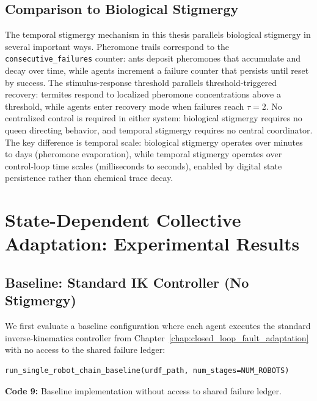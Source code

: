 \documentclass[12pt,a4paper,oneside]{report}
\begin{document}
\subsection{Comparison to Biological Stigmergy}
\label{subsec:comparison_to_biological_stigmergy}

The temporal stigmergy mechanism in this thesis parallels biological stigmergy in several important ways. Pheromone trails correspond to the \texttt{consecutive\_failures} counter: ants deposit pheromones that accumulate and decay over time, while agents increment a failure counter that persists until reset by success. The stimulus-response threshold parallels threshold-triggered recovery: termites respond to localized pheromone concentrations above a threshold, while agents enter recovery mode when failures reach $\tau = 2$. No centralized control is required in either system: biological stigmergy requires no queen directing behavior, and temporal stigmergy requires no central coordinator. The key difference is temporal scale: biological stigmergy operates over minutes to days (pheromone evaporation), while temporal stigmergy operates over control-loop time scales (milliseconds to seconds), enabled by digital state persistence rather than chemical trace decay.

\section{State-Dependent Collective Adaptation: Experimental Results}

\subsection{Baseline: Standard IK Controller (No Stigmergy)}
\label{subsec:baseline_standard_ik_controller_no_stigmergy}

We first evaluate a baseline configuration where each agent executes the standard inverse-kinematics controller from Chapter~\ref{chap:closed_loop_fault_adaptation} with no access to the shared failure ledger:

{\small
\begin{verbatim}
run_single_robot_chain_baseline(urdf_path, num_stages=NUM_ROBOTS)
\end{verbatim}
}
\vspace{0.2cm}
{\small \textbf{Code 9:} Baseline implementation without access to shared failure ledger.\label{code:baseline_call}}
\vspace{0.3cm}
\end{document}
